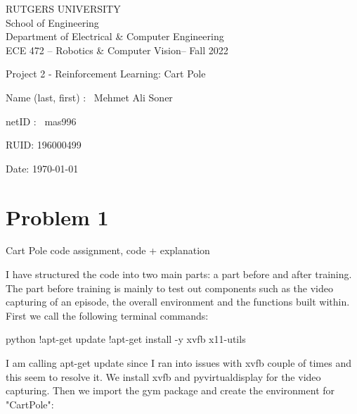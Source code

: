 \documentclass{article}
\numberwithin{equation}{section}
\numberwithin{equation}{section}
\def\ce{\begin{center}}
\def\cend{\end{center}}
\def\red{\color{red}}
\def\blue{\color{blue}}
\begin{document}
\ce
\red\Large
RUTGERS UNIVERSITY \\[0.05in]
School of Engineering \\[0.05in]
Department of Electrical \& Computer Engineering \\[0.2in]
\blue ECE 472 -- Robotics \& Computer Vision-- Fall 2022
\cend

\vspace{1in}

\huge \blue 

\begin{center}
Project 2 - Reinforcement Learning: Cart Pole
\end{center}

\vspace{1in}

\Large

Name (last, first) : \ Mehmet Ali Soner 

\vspace{0.3in}

netID : \ mas996

\vspace{0.3in}

RUID:  196000499

\vspace{0.3in}

Date: \today




\vspace{1in}

\color{black} \normalsize


\newpage




\section{Problem 1}
Cart Pole code assignment, code + explanation


I have structured the code into two main parts: a part before and after training. The part before training is mainly to test out components such as the video capturing of an episode, the overall environment and the functions built within. First we call the following terminal commands:

\begin{mintedbox}{python}
!apt-get update
!apt-get install -y xvfb x11-utils
\end{mintedbox}

I am calling apt-get update since I ran into issues with xvfb couple of times and this seem to resolve it. We install xvfb and pyvirtualdisplay for the video capturing. Then we import the gym package and create the environment for "CartPole":
\end{document}
